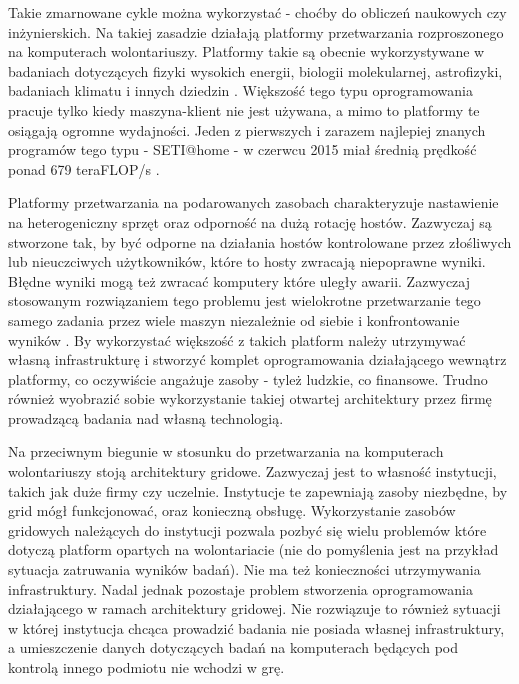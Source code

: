 \documentclass[12pt,a4paper,twoside]{article}
\begin{document}
Takie zmarnowane cykle można wykorzystać - choćby do obliczeń naukowych czy inżynierskich. Na takiej zasadzie działają platformy przetwarzania rozproszonego na komputerach wolontariuszy. Platformy takie są obecnie wykorzystywane w badaniach dotyczących fizyki wysokich energii, biologii molekularnej, astrofizyki, badaniach klimatu i innych dziedzin \cite{computational}. Większość tego typu oprogramowania pracuje tylko kiedy maszyna-klient nie jest używana, a mimo to platformy te osiągają ogromne wydajności. Jeden z pierwszych i zarazem najlepiej znanych programów tego typu - SETI@home - w czerwcu 2015 miał średnią prędkość ponad 679 teraFLOP/s \cite{boincstats}.

Platformy przetwarzania na podarowanych zasobach charakteryzuje nastawienie na heterogeniczny sprzęt oraz odporność na dużą rotację hostów. Zazwyczaj są stworzone tak, by być odporne na działania hostów kontrolowane przez złośliwych lub nieuczciwych użytkowników, które to hosty zwracają niepoprawne wyniki. Błędne wyniki mogą też zwracać komputery które uległy awarii. Zazwyczaj stosowanym rozwiązaniem tego problemu jest wielokrotne przetwarzanie tego samego zadania przez wiele maszyn niezależnie od siebie i konfrontowanie wyników \cite{boinc,computational}. By wykorzystać większość z takich platform należy utrzymywać własną infrastrukturę i stworzyć komplet oprogramowania działającego wewnątrz platformy, co oczywiście angażuje zasoby - tyleż ludzkie, co finansowe. Trudno również wyobrazić sobie wykorzystanie takiej otwartej architektury przez firmę prowadzącą badania nad własną technologią.

Na przeciwnym biegunie w stosunku do przetwarzania na komputerach wolontariuszy stoją architektury gridowe. %
Zazwyczaj jest to własność instytucji, takich jak duże firmy czy uczelnie. Instytucje te zapewniają zasoby niezbędne, by grid mógł funkcjonować, oraz konieczną obsługę. Wykorzystanie zasobów gridowych należących do instytucji pozwala pozbyć się wielu problemów które dotyczą platform opartych na wolontariacie (nie do pomyślenia jest na przykład sytuacja zatruwania wyników badań). Nie ma też konieczności utrzymywania infrastruktury. Nadal jednak pozostaje problem stworzenia oprogramowania działającego w ramach architektury gridowej. Nie rozwiązuje to również sytuacji w której instytucja chcąca prowadzić badania nie posiada własnej infrastruktury, a umieszczenie danych dotyczących badań na komputerach będących pod kontrolą innego podmiotu nie wchodzi w grę.
\end{document}
